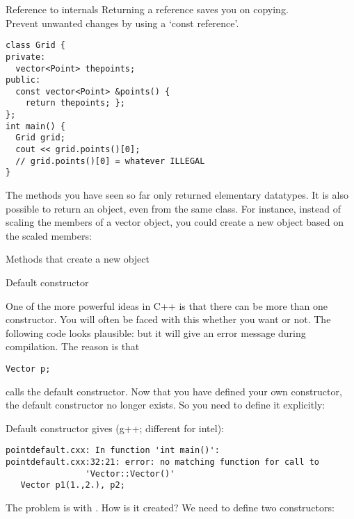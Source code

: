 \begin{block}{Reference to internals}
  \label{sl:obj-return-const-ref}
  Returning a reference saves you on copying.\\
  Prevent unwanted changes by using a `const reference'.
\begin{verbatim}
class Grid {
private:
  vector<Point> thepoints;
public:
  const vector<Point> &points() {
    return thepoints; };
};
int main() {
  Grid grid;
  cout << grid.points()[0];
  // grid.points()[0] = whatever ILLEGAL
}
\end{verbatim}
\end{block}

The methods you have seen so far only returned elementary
datatypes. It is also possible to return an object, even from the same
class. For instance, instead of scaling the members of a vector object, you
could create a new object based on the scaled members:
%

\begin{slide}{Methods that create a new object}
  \label{sl:obj-return}
\end{slide}

 {Default constructor}

One of the more powerful ideas in C++ is that there can be more than
one constructor. You will often be faced with this whether you want or
not. The following code looks plausible:
%
%
but it will give an error message during compilation. The reason is
that 
\begin{verbatim}
Vector p;
\end{verbatim}
calls the default constructor. Now that you have defined your own
constructor, the default constructor no longer exists. So you need to
define it explicitly:
%

\begin{slide}{Default constructor}
  \label{sl:obj-def-construct}
\small
  gives (g++; different for intel):
\begin{verbatim}
pointdefault.cxx: In function 'int main()':
pointdefault.cxx:32:21: error: no matching function for call to
                'Vector::Vector()'
   Vector p1(1.,2.), p2;
\end{verbatim}
The problem is with . How is it created? We need to define two constructors:
\end{slide}

